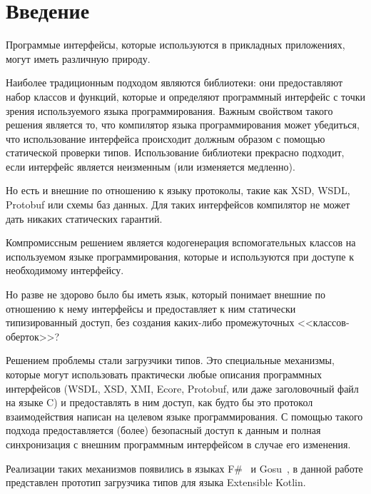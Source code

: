 \section{Введение}

Программые интерфейсы, которые используются в прикладных приложениях, могут иметь различную природу. 

Наиболее традиционным подходом являются библиотеки: они предоставляют набор классов и функций, которые и определяют программный интерфейс с точки зрения используемого языка программирования.
Важным свойством такого решения является то, что компилятор языка программирования может убедиться, что использование интерфейса происходит должным образом с помощью статической проверки типов. Использование библиотеки прекрасно подходит, если интерфейс является неизменным (или изменяется медленно).

Но есть и внешние по отношению к языку протоколы, такие как XSD, WSDL, Protobuf или схемы баз данных. Для таких интерфейсов компилятор не может дать никаких статических гарантий.

Компромиссным решением является кодогенерация вспомогательных классов на используемом языке программирования, которые и используются при доступе к необходимому интерфейсу.

Но разве не здорово было бы иметь язык, который понимает внешние по отношению к нему интерфейсы и предоставляет к ним статически типизированный доступ, без создания каких-либо промежуточных <<классов-оберток>>?

Решением проблемы стали загрузчики типов. Это специальные механизмы, которые могут использовать практически любые описания программных интерфейсов (WSDL, XSD, XMI, Ecore, Protobuf, или даже заголовочный файл на языке C) и предоставлять в ним доступ, как будто бы это протокол взаимодействия написан на целевом \td языке программирования.
С помощью такого подхода предоставляется (\td более) безопасный доступ к данным и полная синхронизация с внешним программным интерфейсом в случае его изменения.

Реализации таких механизмов появились в языках F\#~\cite{fsharp2010expert} и Gosu~\cite{gosuguide}, в данной работе представлен прототип загрузчика типов для языка Extensible Kotlin.

\clearpage